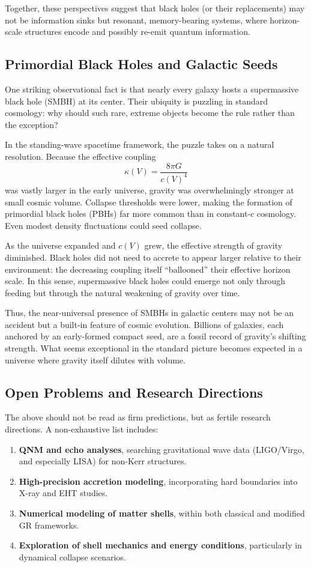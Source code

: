 \documentclass[12pt]{article}
\begin{document}
Together, these perspectives suggest that black holes (or their replacements) may not be information sinks but resonant, memory-bearing systems, where horizon-scale structures encode and possibly re-emit quantum information.

\subsection{Primordial Black Holes and Galactic Seeds}

One striking observational fact is that nearly every galaxy hosts a supermassive black hole (SMBH) at its center. Their ubiquity is puzzling in standard cosmology: why should such rare, extreme objects become the rule rather than the exception?

In the standing-wave spacetime framework, the puzzle takes on a natural resolution. Because the effective coupling 
\[
\kappa(V) = \frac{8\pi G}{c(V)^4}
\]
was vastly larger in the early universe, gravity was overwhelmingly stronger at small cosmic volume. Collapse thresholds were lower, making the formation of primordial black holes (PBHs) far more common than in constant-$c$ cosmology. Even modest density fluctuations could seed collapse.

As the universe expanded and $c(V)$ grew, the effective strength of gravity diminished. Black holes did not need to accrete to appear larger relative to their environment: the decreasing coupling itself ``ballooned'' their effective horizon scale. In this sense, supermassive black holes could emerge not only through feeding but through the natural weakening of gravity over time.

Thus, the near-universal presence of SMBHs in galactic centers may not be an accident but a built-in feature of cosmic evolution. Billions of galaxies, each anchored by an early-formed compact seed, are a fossil record of gravity’s shifting strength. What seems exceptional in the standard picture becomes expected in a universe where gravity itself dilutes with volume.


\subsection{Open Problems and Research Directions}

The above should not be read as firm predictions, but as fertile research directions. A non-exhaustive list includes:

\begin{enumerate}
    \item \textbf{QNM and echo analyses}, searching gravitational wave data (LIGO/Virgo, and especially LISA) for non-Kerr structures.
    \item \textbf{High-precision accretion modeling}, incorporating hard boundaries into X-ray and EHT studies.
    \item \textbf{Numerical modeling of matter shells}, within both classical and modified GR frameworks.
    \item \textbf{Exploration of shell mechanics and energy conditions}, particularly in dynamical collapse scenarios.
\end{enumerate}
\end{document}
